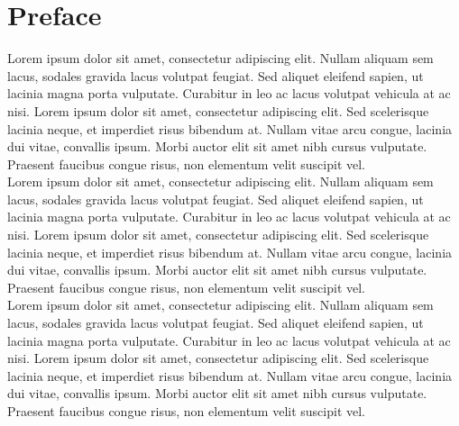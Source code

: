 \chapter*{Preface}

 Lorem ipsum dolor sit amet, consectetur adipiscing elit. Nullam aliquam sem lacus, sodales gravida lacus volutpat feugiat. Sed aliquet eleifend sapien, ut lacinia magna porta vulputate. Curabitur in leo ac lacus volutpat vehicula at ac nisi. Lorem ipsum dolor sit amet, consectetur adipiscing elit. Sed scelerisque lacinia neque, et imperdiet risus bibendum at. Nullam vitae arcu congue, lacinia dui vitae, convallis ipsum. Morbi auctor elit sit amet nibh cursus vulputate. Praesent faucibus congue risus, non elementum velit suscipit vel. \\
Lorem ipsum dolor sit amet, consectetur adipiscing elit. Nullam aliquam sem lacus, sodales gravida lacus volutpat feugiat. Sed aliquet eleifend sapien, ut lacinia magna porta vulputate. Curabitur in leo ac lacus volutpat vehicula at ac nisi. Lorem ipsum dolor sit amet, consectetur adipiscing elit. Sed scelerisque lacinia neque, et imperdiet risus bibendum at. Nullam vitae arcu congue, lacinia dui vitae, convallis ipsum. Morbi auctor elit sit amet nibh cursus vulputate. Praesent faucibus congue risus, non elementum velit suscipit vel. \\

\noindent Lorem ipsum dolor sit amet, consectetur adipiscing elit. Nullam aliquam sem lacus, sodales gravida lacus volutpat feugiat. Sed aliquet eleifend sapien, ut lacinia magna porta vulputate. Curabitur in leo ac lacus volutpat vehicula at ac nisi. Lorem ipsum dolor sit amet, consectetur adipiscing elit. Sed scelerisque lacinia neque, et imperdiet risus bibendum at. Nullam vitae arcu congue, lacinia dui vitae, convallis ipsum. Morbi auctor elit sit amet nibh cursus vulputate. Praesent faucibus congue risus, non elementum velit suscipit vel. 
